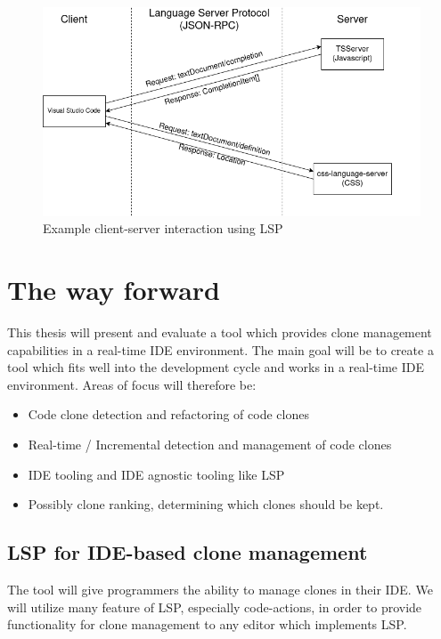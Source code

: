 \documentclass[12pt]{article}
\begin{document}
\begin{figure}
	\includegraphics[width=\textwidth]{images/lspcommunication.png}
	\caption{Example client-server interaction using LSP}
	\label{fig:lspcommunication}
\end{figure}

\section{The way forward}

This thesis will present and evaluate a tool which provides clone management
capabilities in a real-time IDE environment. The main goal will be to create a tool which
fits well into the development cycle and works in a real-time IDE environment. Areas of
focus will therefore be:

\begin{itemize}
	\item Code clone detection and refactoring of code clones
	\item Real-time / Incremental detection and management of code clones
	\item IDE tooling and IDE agnostic tooling like LSP
	\item Possibly clone ranking, determining which clones should be kept.
\end{itemize}

\subsection{LSP for IDE-based clone management}

The tool will give programmers the ability to manage clones in their IDE. We will utilize
many feature of LSP, especially code-actions, in order to provide functionality for clone
management to any editor which implements LSP.
\end{document}
